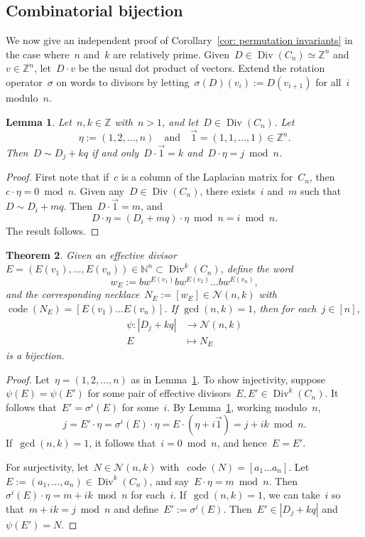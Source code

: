 \documentclass{amsart}
\newtheorem{thm}{Theorem}[section]
\newtheorem{lemma}[thm]{Lemma}
\DeclareMathOperator{\Div}{Div}
\DeclareMathOperator{\code}{code}
\newcommand{\Z}{\mathbb{Z}}
\newcommand{\N}{\mathbb{N}}
\newcommand{\neck}{\mathcal{N}}
\begin{document}
\subsection{Combinatorial bijection}  We now give an independent proof of
Corollary~\ref{cor: permutation invariants} in the case where~$n$ and~$k$ are
relatively prime.
Given~$D\in\Div(C_n)\simeq\Z^n$ and~$v\in\Z^n$, let~$D\cdot v$ be the usual dot
product of vectors.  Extend the rotation operator~$\sigma$ on words to
divisors by letting~$\sigma(D)(v_i):=D(v_{i+1})$ for all~$i$ modulo~$n$.

\begin{lemma}\label{lemma: divisors on C_n}  Let~$n,k\in\Z$ with~$n>1$, and let~$D\in\Div(C_n)$.
  Let
  \[
    \eta := (1,2,\dots,n)\quad\text{and}\quad\vec{1}=(1,1,\dots,1)\in\Z^n.
  \]
  Then~$D\sim D_j+kq$ if and only~$D\cdot\vec{1}=k$ and~$D\cdot\eta=j\bmod n$.
\end{lemma}

\begin{proof} First note that if~$c$ is a column of the Laplacian matrix
for~$C_n$, then~$c\cdot\eta=0\bmod n$.  Given any~$D\in\Div(C_n)$, there
exists~$i$ and~$m$ such that~$D\sim D_i+mq$.  Then~$D\cdot\vec{1}=m$, and
\[
  D\cdot\eta = (D_i+mq)\cdot\eta\bmod n= i\bmod n.
\]
The result follows.
\end{proof}

\begin{thm}\label{thm: necklace bijection}
  Given an effective divisor~$E=(E(v_1),\dots,E(v_n))\in\N^n\subset\Div^k(C_n)$, define the
  word 
\[
  w_E:=bw^{E(v_1)}bw^{E(v_2)}\dots bw^{E(v_n)},
\]
and the corresponding necklace~$N_E:=[w_E]\in\neck(n,k)$ with~$\code(N_E)=[E(v_1)\dots
E(v_n)]$.  If $\gcd(n,k)=1$, then for each~$j\in[n]$,
\begin{align*}
 \psi\colon |D_j+kq|&\to\neck(n,k)\\
  E&\mapsto N_E
\end{align*}
is a bijection.
\end{thm}

\begin{proof} Let~$\eta=(1,2,\dots,n)$ as in Lemma~\ref{lemma: divisors on C_n}.
  To show injectivity, suppose~$\psi(E)=\psi(E')$ for some pair of
  effective divisors~$E,E'\in\Div^k(C_n)$.  It follows that~$E'=\sigma^i(E)$ for
  some~$i$.  By Lemma~\ref{lemma: divisors on C_n}, working modulo~$n$,
  \[
    j = E'\cdot\eta =\sigma^i(E)\cdot\eta=E\cdot(\eta+i\vec{1})=j+ik\bmod n.
  \]
  If~$\gcd(n,k)=1$, it follows that~$i=0\bmod n$, and hence~$E=E'$.

  For surjectivity, let~$N\in\neck(n,k)$ with~$\code(N)=[a_1\dots a_n]$.
  Let~$E:=(a_1,\dots,a_n)\in\Div^k(C_n)$, and say~$E\cdot\eta=m\bmod n$.
  Then $\sigma^i(E)\cdot\eta=m+ik\bmod n$ for each~$i$.  If~$\gcd(n,k)=1$,
  we can take~$i$ so that~$m+ik=j\bmod n$ and define~$E':=\sigma^i(E)$.
  Then~$E'\in|D_j+kq|$ and~$\psi(E')=N$.
\end{proof}
\end{document}
